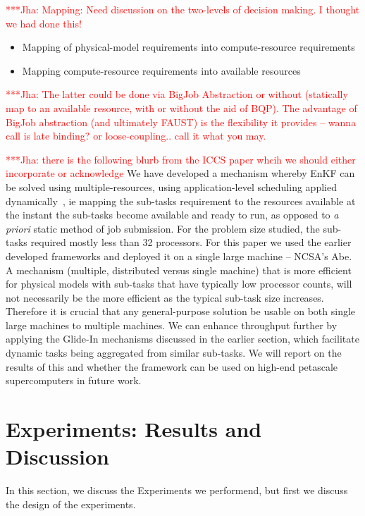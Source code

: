 \documentclass[conference,final]{IEEEtran}
\newcommand{\jhanote}[1]{ {\textcolor{red} { ***Jha: #1 }}}
\newcommand{\jhanote}[1]{}
\begin{document}
\jhanote{Mapping: Need discussion on the two-levels of decision
  making. I thought we had done this!}

\begin{itemize}
\item Mapping of physical-model requirements into compute-resource requirements
\item Mapping compute-resource requirements into available resources
\end{itemize}
\jhanote{The latter could be done via BigJob Abstraction or without
  (statically map to an available resource, with or without the aid of
  BQP).  The advantage of BigJob abstraction (and ultimately FAUST) is
  the flexibility it provides -- wanna call is late binding? or
  loose-coupling..  call it what you may.}

\jhanote{there is the following blurb from the ICCS paper whcih we
  should either incorporate or acknowledge} We have developed a
mechanism whereby EnKF can be solved using multiple-resources, using
application-level scheduling applied dynamically~\cite{saga_tg08}, ie
mapping the sub-tasks requirement to the resources available at the
instant the sub-tasks become available and ready to run, as opposed to
{\it a priori} static method of job submission.  For the problem size
studied, the sub-tasks required mostly less than 32 processors. For
this paper we used the earlier developed frameworks and deployed it on
a single large machine -- NCSA's Abe. A mechanism (multiple,
distributed versus single machine) that is more efficient for physical
models with sub-tasks that have typically low processor counts, will
not necessarily be the more efficient as the typical sub-task size
increases. Therefore it is crucial that any general-purpose solution
be usable on both single large machines to multiple machines.  We can
enhance throughput further by applying the Glide-In mechanisms
discussed in the earlier section, which facilitate dynamic tasks being
aggregated from similar sub-tasks. We will report on the results of
this and whether the framework can be used on high-end petascale
supercomputers in future work.


\section{Experiments: Results and Discussion}

In this section, we discuss the Experiments we performend, but first
we discuss the design of the experiments.
\end{document}
